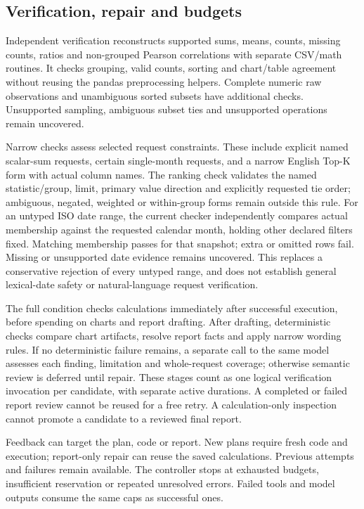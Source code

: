 \subsection{Verification, repair and budgets}\label{verification-repair-and-budgets}

Independent verification reconstructs supported sums, means, counts, missing counts, ratios and non-grouped Pearson correlations with separate CSV/math routines. It checks grouping, valid counts, sorting and chart/table agreement without reusing the pandas preprocessing helpers. Complete numeric raw observations and unambiguous sorted subsets have additional checks. Unsupported sampling, ambiguous subset ties and unsupported operations remain uncovered.

Narrow checks assess selected request constraints. These include explicit named scalar-sum requests, certain single-month requests, and a narrow English Top-K form with actual column names. The ranking check validates the named statistic/group, limit, primary value direction and explicitly requested tie order; ambiguous, negated, weighted or within-group forms remain outside this rule. For an untyped ISO date range, the current checker independently compares actual membership against the requested calendar month, holding other declared filters fixed. Matching membership passes for that snapshot; extra or omitted rows fail. Missing or unsupported date evidence remains uncovered. This replaces a conservative rejection of every untyped range, and does not establish general lexical-date safety or natural-language request verification.

The full condition checks calculations immediately after successful execution, before spending on charts and report drafting. After drafting, deterministic checks compare chart artifacts, resolve report facts and apply narrow wording rules. If no deterministic failure remains, a separate call to the same model assesses each finding, limitation and whole-request coverage; otherwise semantic review is deferred until repair. These stages count as one logical verification invocation per candidate, with separate active durations. A completed or failed report review cannot be reused for a free retry. A calculation-only inspection cannot promote a candidate to a reviewed final report.

Feedback can target the plan, code or report. New plans require fresh code and execution; report-only repair can reuse the saved calculations. Previous attempts and failures remain available. The controller stops at exhausted budgets, insufficient reservation or repeated unresolved errors. Failed tools and model outputs consume the same caps as successful ones.

